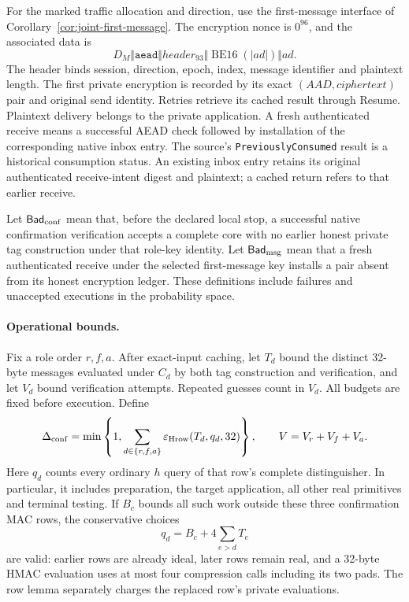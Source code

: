 For the marked traffic allocation and direction, use the first-message
interface of Corollary~\ref{cor:joint-first-message}. The encryption nonce
is $0^{96}$, and the associated data is
\[
 D_M\Vert\texttt{aead}\Vert\mathit{header}_{93}
       \Vert\operatorname{BE16}(|ad|)\Vert ad.
\]
The header binds session, direction, epoch, index, message identifier and
plaintext length. The first private encryption is recorded by its exact
$(\mathit{AAD},\mathit{ciphertext})$ pair and original send identity.
Retries retrieve its cached result through Resume. Plaintext delivery
belongs to the private application. A fresh authenticated receive means
a successful AEAD check followed by installation of the corresponding
native inbox entry. The source's \texttt{PreviouslyConsumed} result is
a historical consumption status. An existing inbox entry retains its
original authenticated receive-intent digest and plaintext; a cached
return refers to that earlier receive.

Let $\mathsf{Bad}_{\rm conf}$ mean that, before the declared local stop,
a successful native confirmation verification accepts a complete core
with no earlier honest private tag construction under that role-key
identity. Let $\mathsf{Bad}_{\rm msg}$ mean that a fresh authenticated
receive under the selected first-message key installs a pair absent from
its honest encryption ledger. These definitions include failures and
unaccepted executions in the probability space.

\paragraph{Operational bounds.}
Fix a role order $r,f,a$. After exact-input caching, let $T_d$ bound the
distinct 32-byte messages evaluated under $C_d$ by both tag construction
and verification, and let $V_d$ bound verification attempts. Repeated
guesses count in $V_d$. All budgets are fixed before execution. Define
\begin{equation}
 \Delta_{\rm conf}=\min\left\{1,
       \sum_{d\in\{r,f,a\}}
          \varepsilon_{\rm Hrow}(T_d,q_d,32)\right\},
 \qquad V=V_r+V_f+V_a.
\label{eq:confirmation-row-cost}
\end{equation}
Here $q_d$ counts every ordinary $h$ query of that row's complete
distinguisher. In particular, it includes preparation, the target
application, all other real primitives and terminal testing. If $B_c$
bounds all such work outside these three confirmation MAC rows, the
conservative choices
\[
 q_d=B_c+4\sum_{e>d}T_e
\]
are valid: earlier rows are already ideal, later rows remain real, and a
32-byte HMAC evaluation uses at most four compression calls including
its two pads. The row lemma separately charges the replaced row's
private evaluations.

